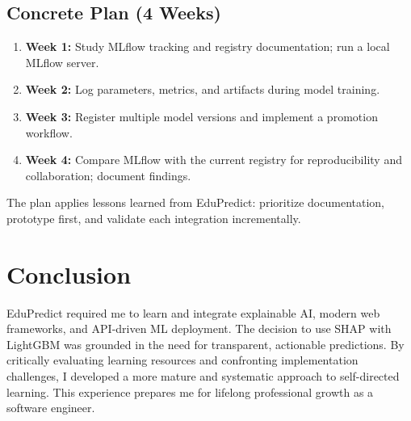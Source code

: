 \documentclass[12pt]{article}
\begin{document}
\subsection{Concrete Plan (4 Weeks)}
\begin{enumerate}
  \item \textbf{Week 1:} Study MLflow tracking and registry documentation; run a local MLflow server.
  \item \textbf{Week 2:} Log parameters, metrics, and artifacts during model training.
  \item \textbf{Week 3:} Register multiple model versions and implement a promotion workflow.
  \item \textbf{Week 4:} Compare MLflow with the current registry for reproducibility and collaboration; document findings.
\end{enumerate}

The plan applies lessons learned from EduPredict: prioritize documentation, prototype first, and validate each integration incrementally.

\section{Conclusion}
EduPredict required me to learn and integrate explainable AI, modern web frameworks, and API-driven ML deployment. The decision to use SHAP with LightGBM was grounded in the need for transparent, actionable predictions. By critically evaluating learning resources and confronting implementation challenges, I developed a more mature and systematic approach to self-directed learning. This experience prepares me for lifelong professional growth as a software engineer.

\printindex
\end{document}
